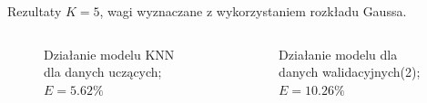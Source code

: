 \documentclass{beamer}
\begin{document}
\begin{frame}{Rezultaty}
$K = 5$, wagi wyznaczane z wykorzystaniem rozkładu Gaussa.
\begin{columns}
	\begin{figure}
		\centering
		\caption{Działanie modelu KNN dla danych uczących; $E = 5.62\%$}
	\end{figure}
	
	\begin{figure}
		\centering
		\caption{Działanie modelu dla danych walidacyjnych(2); $E = 10.26\%$}
	\end{figure}
\end{columns}
\end{frame}
\end{document}
